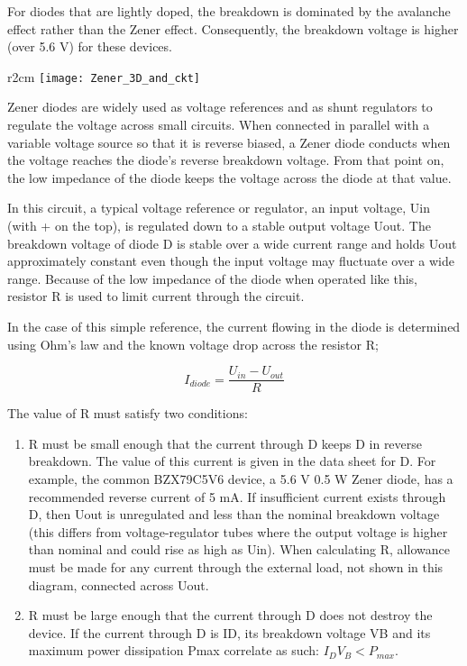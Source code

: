 For diodes that are lightly doped, the breakdown is dominated by the avalanche effect rather than the Zener effect. Consequently, the breakdown voltage is higher (over 5.6 V) for these devices.


\begin{wrapfigure}{r}{2cm}
   \texttt{[image: Zener\_3D\_and\_ckt]}
\end{wrapfigure}

Zener diodes are widely used as voltage references and as shunt regulators to regulate the voltage across small circuits. When connected in parallel with a variable voltage source so that it is reverse biased, a Zener diode conducts when the voltage reaches the diode's reverse breakdown voltage. From that point on, the low impedance of the diode keeps the voltage across the diode at that value.


In this circuit, a typical voltage reference or regulator, an input voltage, Uin (with + on the top), is regulated down to a stable output voltage Uout. The breakdown voltage of diode D is stable over a wide current range and holds Uout approximately constant even though the input voltage may fluctuate over a wide range. Because of the low impedance of the diode when operated like this, resistor R is used to limit current through the circuit.

In the case of this simple reference, the current flowing in the diode is determined using Ohm's law and the known voltage drop across the resistor R;

\[
I_{diode} = \frac{U_{in} - U_{out}}{R}
\]

The value of R must satisfy two conditions:

\begin{enumerate}
\item R must be small enough that the current through D keeps D in reverse breakdown. The value of this current is given in the data sheet for D. For example, the common BZX79C5V6 device, a 5.6 V 0.5 W Zener diode, has a recommended reverse current of 5 mA. If insufficient current exists through D, then Uout is unregulated and less than the nominal breakdown voltage (this differs from voltage-regulator tubes where the output voltage is higher than nominal and could rise as high as Uin). When calculating R, allowance must be made for any current through the external load, not shown in this diagram, connected across Uout.
\item R must be large enough that the current through D does not destroy the device. If the current through D is ID, its breakdown voltage VB and its maximum power dissipation Pmax correlate as such: $I_{D}V_{B}<P_{max}$.
\end{enumerate}

